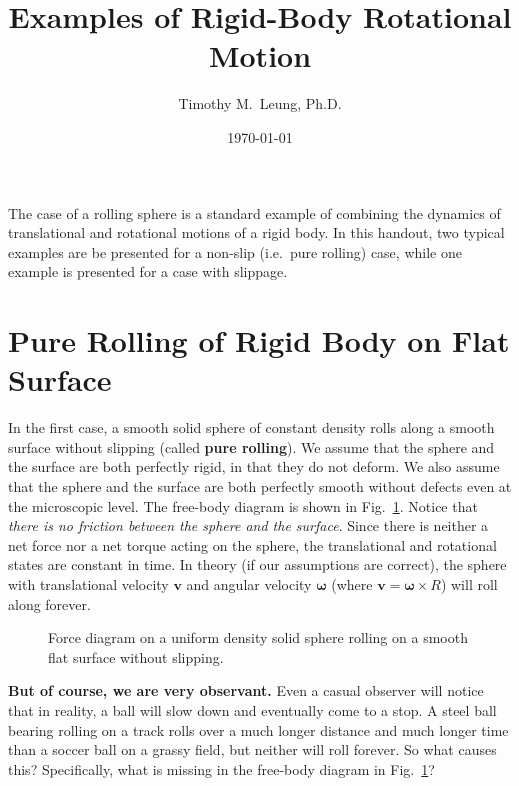 \documentclass{../../../oss-handout}
\title{Examples of Rigid-Body Rotational Motion}
\author{Timothy M.\ Leung, Ph.D.}
\date{\today}
\newcommand{\mb}[1]{\mathbf{#1}}
\begin{document}
\thispagestyle{title}
\gentitle

The case of a rolling sphere is a standard example of combining the dynamics of
translational and rotational motions of a rigid body. In this handout, two
typical examples are be presented for a non-slip (i.e.\ pure rolling) case,
while one example is presented for a case with slippage.

\section{Pure Rolling of Rigid Body on Flat Surface}
\label{no-slip-ball}
In the first case, a smooth solid sphere of constant density rolls along a
smooth surface without slipping (called \textbf{pure rolling}). We assume that
the sphere and the surface are both perfectly rigid, in that they do not
deform. We also assume that the sphere and the surface are both
perfectly smooth without defects even at the microscopic level. The free-body
diagram is shown in Fig.~\ref{roll-flat}. Notice that
\emph{there is no friction between the sphere and the surface}. Since there is
neither a net force nor a net torque acting on the sphere, the translational
and rotational states are constant in time. In theory (if our assumptions are
correct), the sphere with translational velocity $\mb{v}$ and angular velocity
$\bm\omega$ (where $\bm{v}=\bm{\omega}\times R$) will roll along forever.
\begin{figure}[!ht]
  \centering
  \caption{Force diagram on a uniform density solid sphere rolling on a smooth
    flat surface without slipping.}
  \label{roll-flat}
\end{figure}

\textbf{But of course, we are very observant.} Even a casual observer will
notice that in reality, a ball will slow down and eventually come to a stop. A
steel ball bearing rolling on a track rolls over a much longer distance and
much longer time than a soccer ball on a grassy field, but neither will roll
forever. So what causes this? Specifically, what is missing in the free-body
diagram in Fig.~\ref{roll-flat}?
\end{document}
